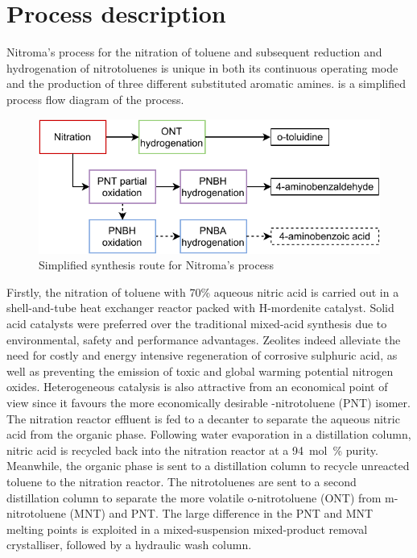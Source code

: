 \section*{Process description}


Nitroma's process for the nitration of toluene and subsequent reduction and hydrogenation of nitrotoluenes is unique in both its continuous operating mode and the production of three different substituted aromatic amines.   is a simplified process flow diagram of the process.
\begin{figure}
    \centering
    \includegraphics[width=0.8\linewidth]{chapters/0-executive-summary/figures/BFD_nitroma-Page-3.pdf}
    \caption{Simplified synthesis route for Nitroma's process}
    \label{fig:BFD-ES}
\end{figure}

Firstly, the nitration of toluene with 70\% aqueous nitric acid is carried out in a shell-and-tube heat exchanger reactor packed with H-mordenite catalyst. Solid acid catalysts were preferred over the traditional mixed-acid synthesis due to environmental, safety and performance advantages. Zeolites indeed alleviate the need for costly and energy intensive regeneration of corrosive sulphuric acid, as well as preventing the emission of toxic and global warming potential nitrogen oxides. Heterogeneous catalysis is also attractive from an economical point of view since it favours the more economically desirable \para-nitrotoluene (PNT) isomer. The nitration reactor effluent is fed to a decanter to separate the aqueous nitric acid from the organic phase. Following water evaporation in a distillation column, nitric acid is recycled back into the nitration reactor at a \SI{94}{mol\percent} purity. Meanwhile, the organic phase is sent to a distillation column to recycle unreacted toluene to the nitration reactor. The nitrotoluenes are sent to a second distillation column to separate the more volatile o-nitrotoluene (ONT) from m-nitrotoluene (MNT) and PNT. The large difference in the PNT and MNT melting points is exploited in a mixed-suspension mixed-product removal crystalliser, followed by a hydraulic wash column.

